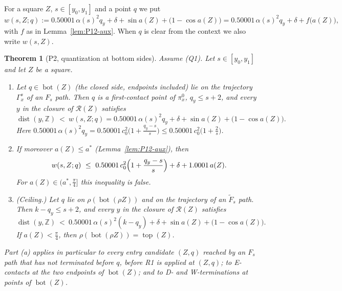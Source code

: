 \documentclass[11pt]{amsart}
\newcommand{\Z}{\mathbb Z}
\newcommand{\cR}{\mathcal R}
\newcommand{\Bot}{\operatorname{bot}}
\newcommand{\Top}{\operatorname{top}}
\newcommand{\dist}{\operatorname{dist}}
\newcommand{\Fs}{F_{s}}
\newtheorem{theorem}{Theorem}[section]
\theoremstyle{definition}
\theoremstyle{remark}
\numberwithin{equation}{section}
\begin{document}
For a square $Z$, $s\in[y_0,y_1]$ and a point $q$ we put
\begin{equation}\label{eq:P12-w}
w(s,Z;q):=0.50001\,\alpha(s)^2q_y+\delta+\sin a(Z)+\bigl(1-\cos a(Z)\bigr)=0.50001\,\alpha(s)^2q_y+\delta+f\bigl(a(Z)\bigr),
\end{equation}
with $f$ as in Lemma~\ref{lem:P12-aux}. When $q$ is clear from the context we also write $w(s,Z)$.

\begin{theorem}[P2, quantization at bottom sides]\label{thm:P2}
Assume \textup{(Q1)}. Let $s\in[y_0,y_1]$ and let $Z$ be a square.
\begin{enumerate}[label=\textup{(\alph*)}]
\item Let $q\in\Bot(Z)$ \textup{(}the closed side, endpoints included\textup{)} lie on the trajectory $\Gamma^s_x$ of an $\Fs$ path. Then $q$ is a first-contact point of $\pi^0_x$, $q_y\le s+2$, and every $y$ in the closure of $\cR(Z)$ satisfies
\[
\dist(y,\Z)\ <\ w(s,Z;q)=0.50001\,\alpha(s)^2q_y+\delta+\sin a(Z)+\bigl(1-\cos a(Z)\bigr).
\]
Here $0.50001\,\alpha(s)^2q_y=0.50001\,c_0^2\bigl(1+\frac{q_y-s}s\bigr)\le0.50001\,c_0^2\bigl(1+\frac2s\bigr)$.
\item If moreover $a(Z)\le a^*$ \textup{(}Lemma~\ref{lem:P12-aux}\textup{)}, then
\[
w(s,Z;q)\ \le\ 0.50001\,c_0^2\Bigl(1+\frac{q_y-s}s\Bigr)+\delta+1.0001\,a(Z).
\]
For $a(Z)\in(a^*,\frac\pi4]$ this inequality is false.
\item \textup{(Ceiling.)} Let $q$ lie on $\rho(\Bot(\rho Z))$ and on the trajectory of an $\tilde F_s$ path. Then $k-q_y\le s+2$, and every $y$ in the closure of $\cR(Z)$ satisfies
\[
\dist(y,\Z)\ <\ 0.50001\,\alpha(s)^2(k-q_y)+\delta+\sin a(Z)+\bigl(1-\cos a(Z)\bigr).
\]
If $a(Z)<\frac\pi4$, then $\rho(\Bot(\rho Z))=\Top(Z)$.
\end{enumerate}
Part \textup{(a)} applies in particular to every entry candidate $(Z,q)$ reached by an $\Fs$ path that has not terminated before $q$, before R1 is applied at $(Z,q)$; to E-contacts at the two endpoints of $\Bot(Z)$; and to D- and W-terminations at points of $\Bot(Z)$.
\end{theorem}
\end{document}
